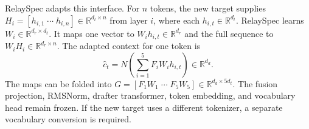 RelaySpec adapts this interface. For $n$ tokens, the new target supplies $H_i=[h_{i,1}\;\cdots\;h_{i,n}]\in\mathbb R^{d_t\times n}$ from layer $i$, where each $h_{i,t}\in\mathbb R^{d_t}$. RelaySpec learns $W_i\in\mathbb R^{d_r\times d_t}$. It maps one vector to $W_i h_{i,t}\in\mathbb R^{d_r}$ and the full sequence to $W_iH_i\in\mathbb R^{d_r\times n}$. The adapted context for one token is
\begin{equation}
 \hat c_t=N\!\left(\sum_{i=1}^{5}F_iW_i h_{i,t}\right)\in\mathbb R^{d_d}.
 \label{eq:relayspec-fusion}
\end{equation}
The maps can be folded into $G=[F_1W_1\;\cdots\;F_5W_5]\in\mathbb R^{d_d\times 5d_t}$. The fusion projection, RMSNorm, drafter transformer, token embedding, and vocabulary head remain frozen. If the new target uses a different tokenizer, a separate vocabulary conversion is required.

